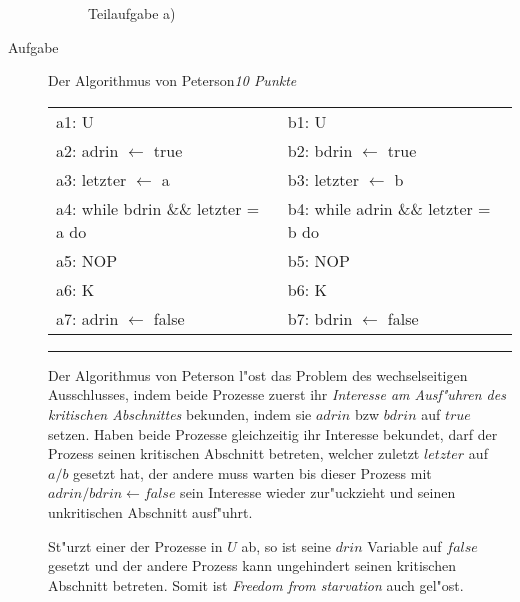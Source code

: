 \documentclass[a4paper,twoside,12pt,fleqn]{article}
\newcounter{AUFGNR}
\newcommand{\AUFGABE}[2]{\vspace{0.3cm}\item[Aufgabe~\arabic{AUFGNR}]\stepcounter{AUFGNR} #1\hfill\emph{#2}}
\begin{document}
\begin{description}
\begin{figure}[htbp]
		\caption{Teilaufgabe a)}
	\end{figure}


\AUFGABE{Der Algorithmus von Peterson}{10 Punkte}
	\begin{tabular}{l|l}
		a1: U & b1: U\\
		a2: adrin $\leftarrow$ true & b2: bdrin $\leftarrow$ true\\
		a3: letzter $\leftarrow$ a & b3: letzter $\leftarrow$ b\\
		a4: while bdrin \&\& letzter = a do &
			b4: while adrin \&\& letzter = b do\\
		a5: \quad NOP & b5: \quad NOP\\
		a6: K & b6: K\\
		a7: adrin $\leftarrow$ false & b7: bdrin $\leftarrow$ false
	\end{tabular}
	\hrule

	Der Algorithmus von Peterson l"ost das Problem des wechselseitigen
	Ausschlusses, indem beide Prozesse zuerst ihr \emph{Interesse am Ausf"uhren
	des kritischen Abschnittes} bekunden, indem sie $adrin$ bzw $bdrin$ auf
	$true$ setzen. Haben beide Prozesse gleichzeitig ihr Interesse bekundet,
	darf der Prozess seinen kritischen Abschnitt betreten, welcher zuletzt
	$letzter$ auf $a/b$ gesetzt hat, der andere muss warten bis dieser Prozess
	mit $adrin/bdrin \leftarrow false$ sein Interesse wieder zur"uckzieht und
	seinen unkritischen Abschnitt ausf"uhrt.

	St"urzt einer der Prozesse in $U$ ab, so ist seine $drin$ Variable auf $false$
	gesetzt und der andere Prozess kann ungehindert seinen kritischen Abschnitt
	betreten. Somit ist \emph{Freedom from starvation} auch gel"ost.


\end{description}
\end{document}
